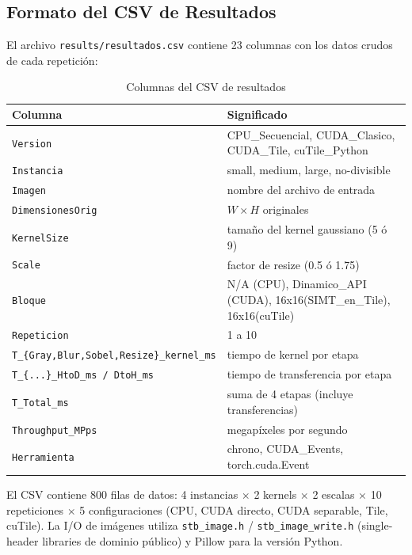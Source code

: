 \documentclass[12pt,a4paper]{article}
\begin{document}
\subsection{Formato del CSV de Resultados}

El archivo \texttt{results/resultados.csv} contiene 23 columnas con los datos crudos de cada repetici\'on:

\begin{table}[H]
\centering
\caption{Columnas del CSV de resultados}
\small
\begin{tabular}{ll}
\toprule
\textbf{Columna} & \textbf{Significado} \\
\midrule
\texttt{Version} & CPU\_Secuencial, CUDA\_Clasico, CUDA\_Tile, cuTile\_Python \\
\texttt{Instancia} & small, medium, large, no-divisible \\
\texttt{Imagen} & nombre del archivo de entrada \\
\texttt{DimensionesOrig} & $W \times H$ originales \\
\texttt{KernelSize} & tama\~no del kernel gaussiano (5 \'o 9) \\
\texttt{Scale} & factor de resize (0.5 \'o 1.75) \\
\texttt{Bloque} & N/A (CPU), Dinamico\_API (CUDA), 16x16(SIMT\_en\_Tile), 16x16(cuTile) \\
\texttt{Repeticion} & 1 a 10 \\
\texttt{T\_\{Gray,Blur,Sobel,Resize\}\_kernel\_ms} & tiempo de kernel por etapa \\
\texttt{T\_\{...\}\_HtoD\_ms / DtoH\_ms} & tiempo de transferencia por etapa \\
\texttt{T\_Total\_ms} & suma de 4 etapas (incluye transferencias) \\
\texttt{Throughput\_MPps} & megap\'ixeles por segundo \\
\texttt{Herramienta} & chrono, CUDA\_Events, torch.cuda.Event \\
\bottomrule
\end{tabular}
\end{table}

El CSV contiene 800 filas de datos: 4 instancias $\times$ 2 kernels $\times$ 2 escalas $\times$ 10 repeticiones $\times$ 5 configuraciones (CPU, CUDA directo, CUDA separable, Tile, cuTile). La I/O de im\'agenes utiliza \texttt{stb\_image.h} / \texttt{stb\_image\_write.h} (single-header libraries de dominio p\'ublico) y Pillow para la versi\'on Python.

\end{document}
